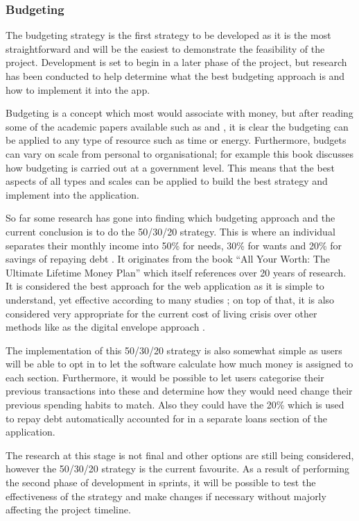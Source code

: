 \subsubsection{Budgeting}
The budgeting strategy is the first strategy to be developed as it is the most straightforward and will be the easiest to demonstrate the feasibility of the project. Development is set to begin in a later phase of the project, but research has been conducted to help determine what the best budgeting approach is and how to implement it into the app.

Budgeting is a concept which most would associate with money, but after reading some of the academic papers available such as \cite{hansen2003practice} and \cite{shim2011budgeting}, it is clear the budgeting can be applied to any type of resource such as time or energy. Furthermore, budgets can vary on scale from personal to organisational; for example this book \cite{wildavsky1986budgeting} discusses how budgeting is carried out at a government level. This means that the best aspects of all types and scales can be applied to build the best strategy and implement into the application.

So far some research has gone into finding which budgeting approach and the current conclusion is to do the 50/30/20 strategy. This is where an individual separates their monthly income into 50\% for needs, 30\% for wants and 20\% for savings of repaying debt \cite{503020Strategy}. It originates from the book ``All Your Worth: The Ultimate Lifetime Money Plan'' \cite{warren2005all} which itself references over 20 years of research. It is considered the best approach for the web application as it is simple to understand, yet effective according to many studies \cite{503020Examples}; on top of that, it is also considered very appropriate for the current cost of living crisis over other methods like as the digital envelope approach \cite{503020InCostLivingCrisis}.

The implementation of this 50/30/20 strategy is also somewhat simple as users will be able to opt in to let the software calculate how much money is assigned to each section. Furthermore, it would be possible to let users categorise their previous transactions into these and determine how they would need change their previous spending habits to match. Also they could have the 20\% which is used to repay debt automatically accounted for in a separate loans section of the application.

The research at this stage is not final and other options are still being considered, however the 50/30/20 strategy is the current favourite. As a result of performing the second phase of development in sprints, it will be possible to test the effectiveness of the strategy and make changes if necessary without majorly affecting the project timeline.

